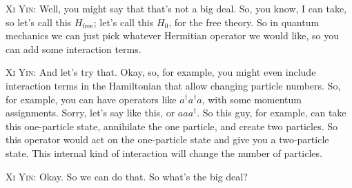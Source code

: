 \noindent\textsc{Xi Yin:} Well, you might say that that's not a big deal. So, you know, I can take, so let's call this $H_{\mathrm{free}}$; let's call this $H_0$, for the free theory. So in quantum mechanics we can just pick whatever Hermitian operator we would like, so you can add some interaction terms.\par


\noindent\textsc{Xi Yin:} And let's try that. Okay, so, for example, you might even include interaction terms in the Hamiltonian that allow changing particle numbers. So, for example, you can have operators like $a^\dagger a^\dagger a$, with some momentum assignments. Sorry, let's say like this, or $a a a^\dagger$. So this guy, for example, can take this one-particle state, annihilate the one particle, and create two particles. So this operator would act on the one-particle state and give you a two-particle state. This internal kind of interaction will change the number of particles.\par

\noindent\textsc{Xi Yin:} Okay. So we can do that. So what's the big deal?\par

